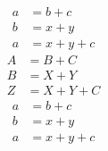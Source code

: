 \begin{equation*}
\begin{split}
a &= b + c   \\
b &= x + y  \\
a &= x + y + c
\end{split}
\end{equation*}
\begin{equation}
\label{foo}
\begin{split}
A &= B + C   \\
B &= X + Y  \\
Z &= X + Y + C
\end{split}
\end{equation}
\begin{equation}
\begin{split}
a &= b + c   \\
b &= x + y  \\
a &= x + y + c
\end{split}
\end{equation}
